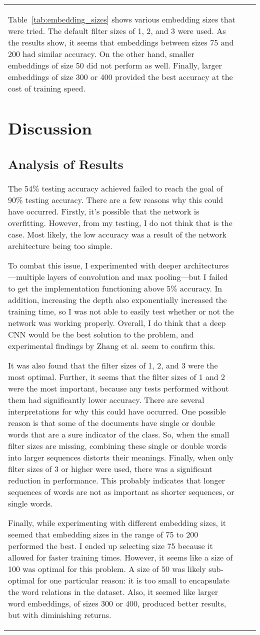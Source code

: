 \documentclass{article}
\begin{document}
\begin{table}[t]
\begin{tabular}{lll}
Table~\ref{tab:embedding_sizes} shows various embedding sizes that were tried. The default filter sizes of 1, 2, and 3 were used.
As the results show, it seems that embeddings between sizes 75 and 200 had similar accuracy. On the other hand, smaller embeddings of
size 50 did not perform as well. Finally, larger embeddings of size 300 or 400 provided the best accuracy at the cost of training speed.

\section{Discussion}
\subsection{Analysis of Results}
The 54\% testing accuracy achieved failed to reach the goal of 90\% testing accuracy. There are a few reasons why this could have occurred.
Firstly, it's possible that the network is overfitting. However, from my testing, I do not think that is the case. Most likely, the low
accuracy was a result of the network architecture being too simple.

To combat this issue, I experimented with deeper architectures—multiple layers of convolution and max pooling—but I failed to get the
implementation functioning above 5\% accuracy. In addition, increasing the depth also exponentially increased the training time, so I was not
able to easily test whether or not the network was working properly. Overall, I do think that a deep CNN would be the best solution to the
problem, and experimental findings by Zhang et al. \cite{zhang} seem to confirm this.

It was also found that the filter sizes of 1, 2, and 3 were the most optimal. Further, it seems that the filter sizes of 1 and 2 were the most
important, because any tests performed without them had significantly lower accuracy. There are several interpretations for why this could
have occurred. One possible reason is that some of the documents have single or double words that are a sure indicator of the class. So, when the
small filter sizes are missing, combining these single or double words into larger sequences distorts their meanings. Finally, when only filter sizes
of 3 or higher were used, there was a significant reduction in performance. This probably indicates that longer sequences of words are not as
important as shorter sequences, or single words.

Finally, while experimenting with different embedding sizes, it seemed that embedding sizes in the range of 75 to 200 performed the best. I ended up
selecting size 75 because it allowed for faster training times. However, it seems like a size of 100 was optimal for this problem. A size of
50 was likely sub-optimal for one particular reason: it is too small to encapsulate the word relations in the dataset. Also, it seemed like
larger word embeddings, of sizes 300 or 400, produced better results, but with diminishing returns.


\end{tabular}
\end{table}
\end{document}
